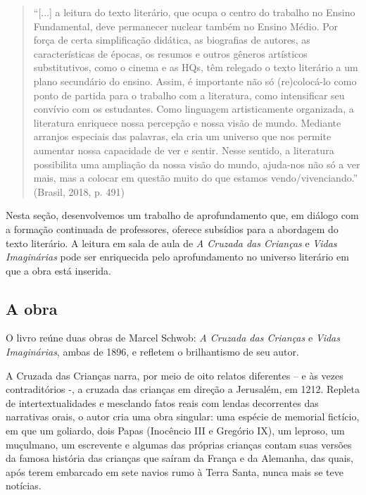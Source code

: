 \documentclass[12pt]{extarticle}
\begin{document}
\begin{quote}
``{[}...{]} a leitura do texto literário, que ocupa o centro do trabalho
no Ensino Fundamental, deve permanecer nuclear também no Ensino Médio.
Por força de certa simplificação didática, as biografias de autores, as
características de épocas, os resumos e outros gêneros artísticos
substitutivos, como o cinema e as HQs, têm relegado o texto literário a
um plano secundário do ensino. Assim, é importante não só (re)colocá-lo
como ponto de partida para o trabalho com a literatura, como
intensificar seu convívio com os estudantes. Como linguagem
artisticamente organizada, a literatura enriquece nossa percepção e
nossa visão de mundo. Mediante arranjos especiais das palavras, ela cria
um universo que nos permite aumentar nossa capacidade de ver e sentir.
Nesse sentido, a literatura possibilita uma ampliação da nossa visão do
mundo, ajuda-nos não só a ver mais, mas a colocar em questão muito do
que estamos vendo/vivenciando.'' (Brasil, 2018, p. 491)
\end{quote}

Nesta seção, desenvolvemos um trabalho de aprofundamento que, em diálogo
com a formação continuada de professores, oferece subsídios para a
abordagem do texto literário. A leitura em sala de aula de \emph{A
Cruzada das Crianças} e \emph{Vidas Imaginárias} pode ser enriquecida
pelo aprofundamento no universo literário em que a obra está inserida.

\subsection{A obra}

O livro reúne duas obras de Marcel Schwob: \emph{A Cruzada das Crianças}
e \emph{Vidas Imaginárias}, ambas de 1896, e refletem o brilhantismo de
seu autor.

A Cruzada das Crianças narra, por meio de oito relatos diferentes -- e
às vezes contraditórios -, a cruzada das crianças em direção a
Jerusalém, em 1212. Repleta de intertextualidades e mesclando fatos
reais com lendas decorrentes das narrativas orais, o autor cria uma obra
singular: uma espécie de memorial fictício, em que um goliardo, dois
Papas (Inocêncio III e Gregório IX), um leproso, um muçulmano, um
escrevente e algumas das próprias crianças contam suas versões da famosa
história das crianças que saíram da França e da Alemanha, das quais,
após terem embarcado em sete navios rumo à Terra Santa, nunca mais se
teve notícias.
\end{document}
